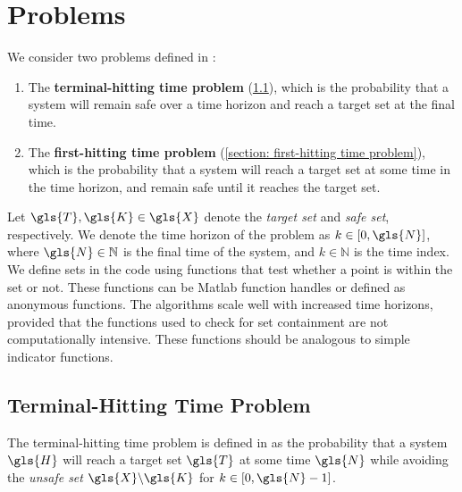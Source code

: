 \documentclass[11pt]{article}
\begin{document}

\section{Problems}
\label{section: problems}

We consider two problems defined in \cite{summers2010verification}:
\begin{enumerate}
  \item The \textbf{terminal-hitting time problem} (\ref{section: terminal-hitting time problem}), which is the probability that a system will remain safe over a time horizon and reach a target set at the final time.
  \item The \textbf{first-hitting time problem} (\ref{section: first-hitting time problem}), which is the probability that a system will reach a target set at some time in the time horizon, and remain safe until it reaches the target set.
\end{enumerate}

Let $\gls{T}, \gls{K} \in \gls{X}$ denote the \emph{target set} and \emph{safe set}, respectively.
%
We denote the time horizon of the problem as $k \in [0, \gls{N}]$, where $\gls{N} \in \mathbb{N}$ is the final time of the system, and $k \in \mathbb{N}$ is the time index. We define sets in the code using functions that test whether a point is within the set or not. These functions can be Matlab function handles or defined as anonymous functions.
%
The algorithms scale well with increased time horizons, provided that the functions used to check for set containment are not computationally intensive.
%
These functions should be analogous to simple indicator functions.


\subsection{Terminal-Hitting Time Problem}
\label{section: terminal-hitting time problem}

The terminal-hitting time problem is defined in \cite{summers2010verification} as the probability that a system $\gls{H}$ will reach a target set $\gls{T}$ at some time $\gls{N}$ while avoiding the \emph{unsafe set} $\gls{X}\backslash\gls{K}$ for $k \in [0, \gls{N}-1]$.
\end{document}
